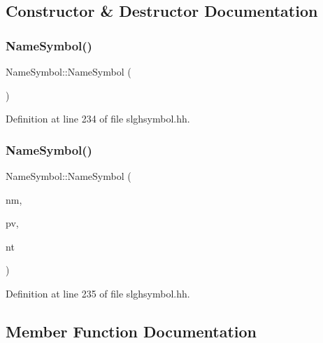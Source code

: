\subsection{Constructor \& Destructor Documentation}
\mbox{\label{class_name_symbol_a7ce4d313e2b7f9d88f99dbc74a85f1b0}} 
\subsubsection{\texorpdfstring{NameSymbol()}{NameSymbol()}\hspace{0.1cm}{\footnotesize\ttfamily [1/2]}}
{\footnotesize\ttfamily Name\+Symbol\+::\+Name\+Symbol (\begin{DoxyParamCaption}\item[{void}]{ }\end{DoxyParamCaption})\hspace{0.3cm}{\ttfamily [inline]}}



Definition at line 234 of file slghsymbol.\+hh.

\mbox{\label{class_name_symbol_aba5507b31019202220bd81fd7e8e9487}} 
\subsubsection{\texorpdfstring{NameSymbol()}{NameSymbol()}\hspace{0.1cm}{\footnotesize\ttfamily [2/2]}}
{\footnotesize\ttfamily Name\+Symbol\+::\+Name\+Symbol (\begin{DoxyParamCaption}\item[{const string \&}]{nm,  }\item[{\mbox{\hyperlink{class_pattern_value}{Pattern\+Value}} $\ast$}]{pv,  }\item[{const vector$<$ string $>$ \&}]{nt }\end{DoxyParamCaption})\hspace{0.3cm}{\ttfamily [inline]}}



Definition at line 235 of file slghsymbol.\+hh.



\subsection{Member Function Documentation}
\mbox{\label{class_name_symbol_a348f7c9857b32717e9ac62c231108686}} 
